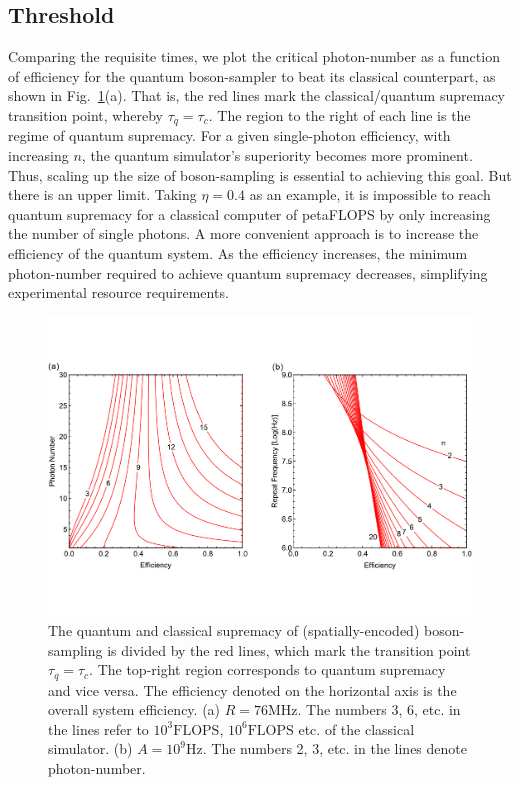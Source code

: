 \documentclass[aps,rmp,twocolumn,amsmath,amssymb,nofootinbib,superscriptaddress]{revtex4}
\begin{document}
\subsection{Threshold}

Comparing the requisite times, we plot the critical photon-number as a function of efficiency for the quantum boson-sampler to beat its classical counterpart, as shown in Fig.~\ref{fig:curves_1}(a). That is, the red lines mark the classical/quantum supremacy transition point, whereby \mbox{$\tau_q=\tau_c$}. The region to the right of each line is the regime of quantum supremacy. For a given single-photon efficiency, with increasing $n$, the quantum simulator's superiority becomes more prominent. Thus, scaling up the size of boson-sampling is essential to achieving this goal. But there is an upper limit. Taking \mbox{$\eta=0.4$} as an example, it is impossible to reach quantum supremacy for a classical computer of petaFLOPS by only increasing the number of single photons. A more convenient approach is to increase the efficiency of the quantum system. As the efficiency increases, the minimum photon-number required to achieve quantum supremacy decreases, simplifying experimental resource requirements.

\begin{figure}[!htb]
\includegraphics[width=\columnwidth]{curves_1}
\caption{The quantum and classical supremacy of (spatially-encoded) boson-sampling is divided by the red lines, which mark the transition point \mbox{$\tau_q=\tau_c$}. The top-right region corresponds to quantum supremacy and vice versa. The efficiency denoted on the horizontal axis is the overall system efficiency. (a) $R=76$MHz. The numbers 3, 6, etc. in the lines refer to $10^3\mathrm{FLOPS}$, $10^6\mathrm{FLOPS}$ etc. of the classical simulator. (b) $A=10^9\mathrm{Hz}$. The numbers 2, 3, etc. in the lines denote photon-number.} \label{fig:curves_1}
\end{figure}
\end{document}
